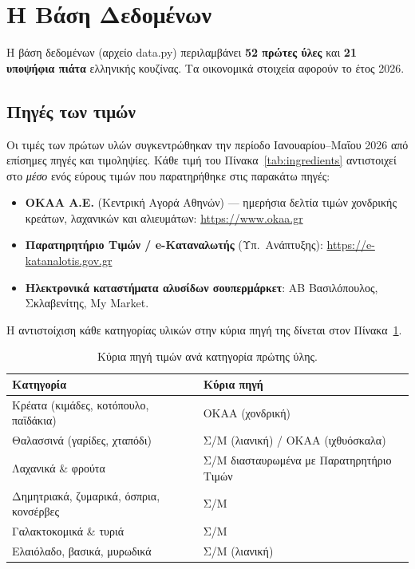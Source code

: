 \documentclass[11pt,a4paper]{article}
\newcommand{\en}[1]{\textenglish{#1}}
\begin{document}
\section{Η Βάση Δεδομένων}\label{sec:data}
Η βάση δεδομένων (αρχείο \en{data.py}) περιλαμβάνει \textbf{52 πρώτες ύλες} και
\textbf{21 υποψήφια πιάτα} ελληνικής κουζίνας. Τα οικονομικά στοιχεία αφορούν το
έτος 2026.

\subsection{Πηγές των τιμών}
Οι τιμές των πρώτων υλών συγκεντρώθηκαν την περίοδο Ιανουαρίου--Μαΐου 2026 από
επίσημες πηγές και τιμοληψίες. Κάθε τιμή του Πίνακα~\ref{tab:ingredients}
αντιστοιχεί στο \emph{μέσο} ενός εύρους τιμών που παρατηρήθηκε στις παρακάτω πηγές:
\begin{itemize}
  \item \textbf{ΟΚΑΑ Α.Ε.} (Κεντρική Αγορά Αθηνών) — ημερήσια δελτία τιμών
        χονδρικής κρεάτων, λαχανικών και αλιευμάτων: \url{https://www.okaa.gr}
  \item \textbf{Παρατηρητήριο Τιμών / e-Καταναλωτής} (Υπ.\ Ανάπτυξης):
        \url{https://e-katanalotis.gov.gr}
  \item \textbf{Ηλεκτρονικά καταστήματα αλυσίδων σουπερμάρκετ}: ΑΒ Βασιλόπουλος,
        Σκλαβενίτης, \en{My Market}.
\end{itemize}
Η αντιστοίχιση κάθε κατηγορίας υλικών στην κύρια πηγή της δίνεται στον
Πίνακα~\ref{tab:sources}.

\begin{table}[htbp]
\centering
\caption{Κύρια πηγή τιμών ανά κατηγορία πρώτης ύλης.}
\label{tab:sources}
\small
\begin{tabular}{@{}ll@{}}
\toprule
\textbf{Κατηγορία} & \textbf{Κύρια πηγή}\\
\midrule
Κρέατα (κιμάδες, κοτόπουλο, παϊδάκια) & ΟΚΑΑ (χονδρική)\\
Θαλασσινά (γαρίδες, χταπόδι) & Σ/Μ (λιανική) / ΟΚΑΑ (ιχθυόσκαλα)\\
Λαχανικά \& φρούτα & Σ/Μ διασταυρωμένα με Παρατηρητήριο Τιμών\\
Δημητριακά, ζυμαρικά, όσπρια, κονσέρβες & Σ/Μ\\
Γαλακτοκομικά \& τυριά & Σ/Μ\\
Ελαιόλαδο, βασικά, μυρωδικά & Σ/Μ (λιανική)\\
\bottomrule
\end{tabular}
\end{table}
\end{document}
